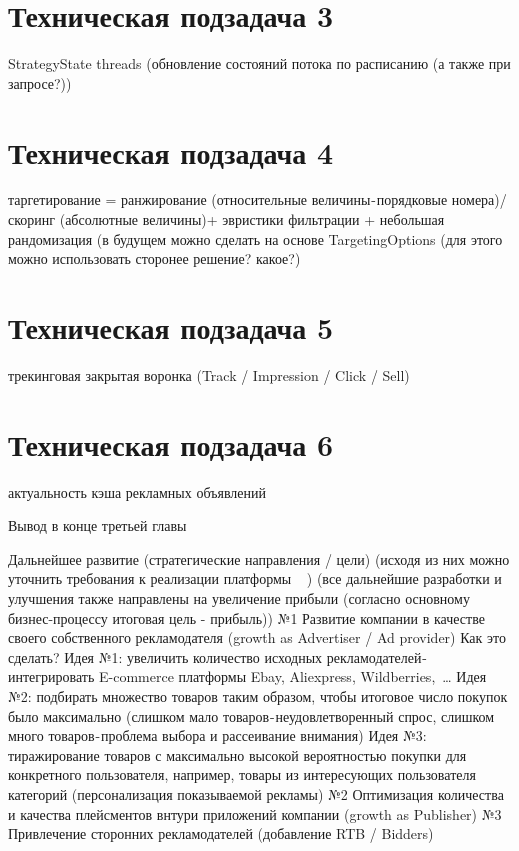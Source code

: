 \documentclass[times]{itmo-student-thesis}
\begin{document}
\section{Техническая подзадача 3}
StrategyState threads (обновление состояний потока по расписанию (а также при запросе?))

\section{Техническая подзадача 4}
таргетирование = ранжирование (относительные величины - порядковые номера)/ скоринг (абсолютные величины)+ эвристики фильтрации + небольшая рандомизация (в будущем можно сделать на основе TargetingOptions (для этого можно использовать сторонее решение? какое?)

\section{Техническая подзадача 5}
трекинговая закрытая воронка (Track / Impression / Click / Sell)

\section{Техническая подзадача 6} актуальность кэша рекламных объявлений


\chapterconclusion

Вывод в конце третьей главы

\startconclusionpage

Дальнейшее развитие (стратегические направления / цели) (исходя из них можно уточнить требования к реализации платформы 🤔 )
(все дальнейшие разработки и улучшения также направлены на увеличение прибыли (согласно основному бизнес-процессу итоговая цель - прибыль))
№1 Развитие компании в качестве своего собственного рекламодателя (growth as Advertiser / Ad provider)
Как это сделать?
Идея №1: увеличить количество исходных рекламодателей - интегрировать E-commerce платформы Ebay, Aliexpress, Wildberries, …
Идея №2: подбирать множество товаров таким образом, чтобы итоговое число покупок было максимально (слишком мало товаров - неудовлетворенный спрос, слишком много товаров - проблема выбора и рассеивание внимания)
Идея №3: тиражирование товаров с максимально высокой вероятностью покупки для конкретного пользователя, например, товары из интересующих пользователя категорий (персонализация показываемой рекламы)
№2 Оптимизация количества и качества плейсментов внтури приложений компании (growth as Publisher)
№3 Привлечение сторонних рекламодателей (добавление RTB / Bidders)

\printmainbibliography


\appendix

                
\end{document}
